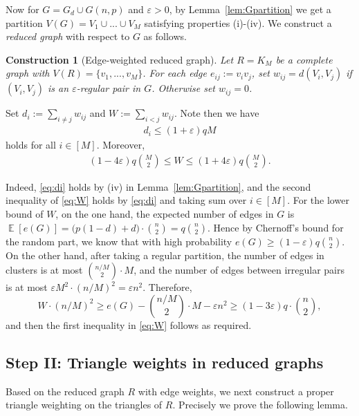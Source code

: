 \documentclass[11pt,reqno]{amsart}
\newtheorem{construction}[theorem]{Construction}
\theoremstyle{definition}
\theoremstyle{remark}
\newcommand\E{\operatorname{\mathbb{E}}}
\renewcommand\leq{\leqslant}
\renewcommand\geq{\geqslant}
\renewcommand\le{\leqslant}
\begin{document}
Now for $G=G_d\cup G(n,p)$ and $\varepsilon>0$, by Lemma~\ref{lem:Gpartition} we get a partition $V(G)=V_1\cup...\cup V_M$ satisfying properties (i)-(iv). We construct a \emph{reduced graph} with respect to $G$ as follows. 

\begin{construction}[Edge-weighted reduced graph]\label{construction:reducedgraph}
 Let $R=K_M$ be a complete graph with $V(R)=\{v_1,...,v_M\}$. For each edge $e_{ij}:=v_iv_j$, set
$w_{ij}= d(V_i,V_j)$ if $(V_i,V_j)$ is an $\varepsilon$-regular pair in $G$. Otherwise set $w_{ij}=0$.   
\end{construction}



Set $d_i:=\sum_{i\neq j}w_{ij}$ and $ W:=\sum_{i<j} w_{ij}$. Note then we have
\begin{align}\label{eq:di}
d_i\leq (1+\varepsilon)qM
\end{align}
holds for all $i\in [M]$. Moreover,
\begin{align}\label{eq:W}
(1-4\varepsilon)q\binom{M}{2}\le W\le
(1+4\varepsilon)q\binom{M}{2}.   
\end{align}

Indeed, \eqref{eq:di} holds by (iv) in Lemma~\ref{lem:Gpartition}, and the second inequality of \eqref{eq:W} holds by \eqref{eq:di} and taking sum over $i\in[M]$. For the lower bound of $W$, on the one hand, the expected number of edges in $G$ is $\E[e(G)]=\big(p(1-d)+d\big)\cdot\binom{n}{2}=q\binom{n}{2}$. Hence by Chernoff's bound for the random part, we know that with high probability $e(G)\geq (1-\varepsilon)q\binom{n}{2}$. On the other hand, after taking a regular partition, the number of edges in clusters is at most $\binom{n/M}{2}\cdot M$, and the number of edges between irregular pairs is at most $\varepsilon M^2 \cdot (n/M)^2 = \varepsilon n^2$. Therefore,
$$W\cdot (n/M)^2\geq e(G)- \binom{n/M}{2}\cdot M- \varepsilon n^2\geq (1-3\varepsilon)q\cdot\binom{n}{2},$$
and then the first inequality in \eqref{eq:W} follows as required. 





\medskip




\subsection{Step II: Triangle weights in reduced graphs}
Based on the reduced graph $R$ with edge weights, we next construct a proper triangle weighting on the triangles of $R$. Precisely we prove the following lemma.
\end{document}
